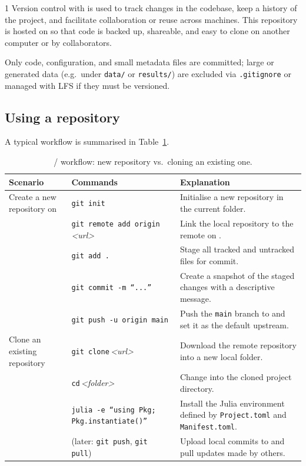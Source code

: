 \begin{multicols}{1}
Version control with \Git{} is used to track changes in the \Julia{} codebase, keep a history of the project, and facilitate collaboration or reuse across machines. This repository is hosted on \GitHub{} so that code is backed up, shareable, and easy to clone on another computer or by collaborators. 

Only code, configuration, and small metadata files are committed; large or generated data (e.g.\ under \texttt{data/} or \texttt{results/}) are excluded via \texttt{.gitignore} or managed with \Git{} LFS if they must be versioned.

\subsection{Using a \GitHub{} repository}

A typical workflow is summarised in Table~\ref{tab:github-workflow}.

\begin{fullwidth}
\begin{table}[H]
  \centering
  \small
\caption{\Git{}/\GitHub{} workflow: new repository vs.\ cloning an existing one.}
  \label{tab:github-workflow}
  \begin{tabular}{@{}p{}p{}p{}@{}}
    \toprule
    \textbf{Scenario} & \textbf{Commands} & \textbf{Explanation} \\
    \midrule
    Create a new repository on \GitHub{}
    & \texttt{git init}
    & Initialise a new \Git{} repository in the current folder. \\
    & \texttt{git remote add origin}\,\textit{<url>}
    & Link the local repository to the remote on \GitHub{}. \\
    & \texttt{git add .}
    & Stage all tracked and untracked files for commit. \\
    & \texttt{git commit -m ``...''}
    & Create a snapshot of the staged changes with a descriptive message. \\
    & \texttt{git push -u origin main}
    & Push the \texttt{main} branch to \GitHub{} and set it as the default upstream. \\
    \addlinespace
    Clone an existing \GitHub{} repository
    & \texttt{git clone}\,\textit{<url>}
    & Download the remote repository into a new local folder. \\
    & \texttt{cd}\,\textit{<folder>}
    & Change into the cloned project directory. \\
    & \texttt{julia -e ``using Pkg; Pkg.instantiate()''}
    & Install the Julia environment defined by \texttt{Project.toml} and \texttt{Manifest.toml}. \\
    & (later: \texttt{git push}, \texttt{git pull})
    & Upload local commits to \GitHub{} and pull updates made by others. \\
    \bottomrule
  \end{tabular}
\end{table}
\end{fullwidth}


\end{multicols}
